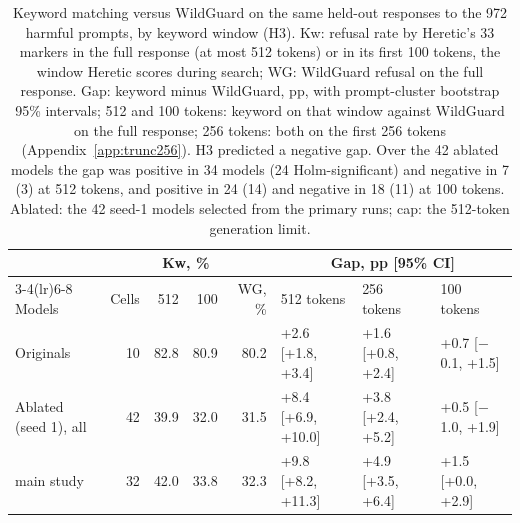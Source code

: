\begin{table}[t]
\centering\footnotesize
\setlength{\tabcolsep}{2.8pt}
\caption{Keyword matching versus WildGuard on the same held-out responses to the 972 harmful prompts, by keyword window
(H3). Kw: refusal rate by Heretic's 33 markers in the full response (at most 512 tokens) or in its first 100 tokens,
the window Heretic scores during search; WG: WildGuard refusal on the full response. Gap: keyword minus WildGuard, pp,
with prompt-cluster bootstrap 95\% intervals; 512 and 100 tokens: keyword on that window against WildGuard on the full
response; 256 tokens: both on the first 256 tokens (Appendix~\ref{app:trunc256}). H3 predicted a negative gap. Over
the 42 ablated models the gap was positive in 34 models (24 Holm-significant) and negative in 7 (3) at 512 tokens, and
positive in 24 (14) and negative in 18 (11) at 100 tokens. Ablated: the 42 seed-1 models selected from the primary runs;
cap: the 512-token generation limit.}
\label{tab:h3-windows}
\begin{tabular}{@{}lrrrrlll@{}}
\toprule
 & & \multicolumn{2}{c}{Kw, \%} & & \multicolumn{3}{c}{Gap, pp [95\% CI]} \\
\cmidrule(lr){3-4}\cmidrule(lr){6-8}
Models & Cells & 512 & 100 & WG, \% & 512 tokens & 256 tokens & 100 tokens \\
\midrule
Originals & 10 & 82.8 & 80.9 & 80.2 & +2.6 [+1.8, +3.4] & +1.6 [+0.8, +2.4] & +0.7 [$-$0.1, +1.5] \\
\midrule
Ablated (seed 1), all & 42 & 39.9 & 32.0 & 31.5 & +8.4 [+6.9, +10.0] & +3.8 [+2.4, +5.2] & +0.5 [$-$1.0, +1.9] \\
\quad main study & 32 & 42.0 & 33.8 & 32.3 & +9.8 [+8.2, +11.3] & +4.9 [+3.5, +6.4] & +1.5 [+0.0, +2.9] \\

\end{tabular}
\end{table}
